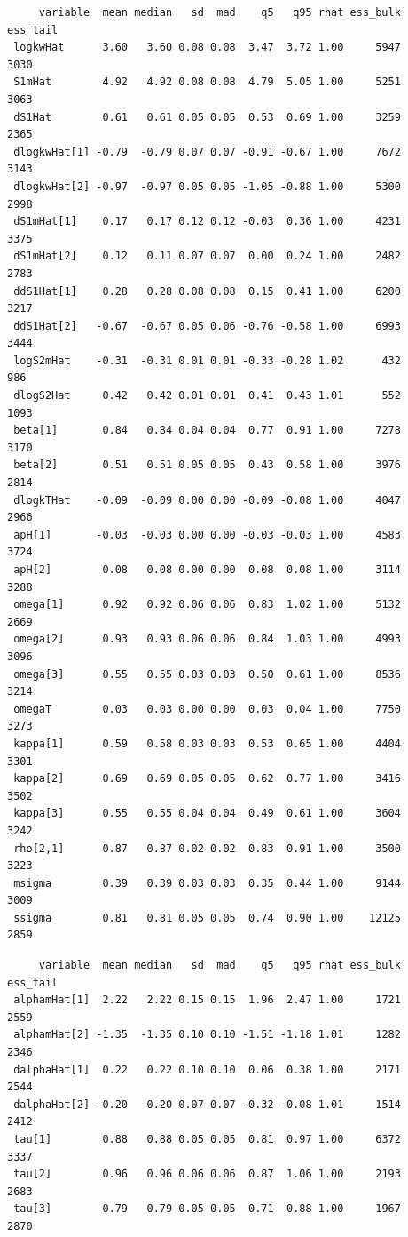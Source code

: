 \documentclass[
]{article}
\begin{document}
\begin{verbatim}
     variable  mean median   sd  mad    q5   q95 rhat ess_bulk ess_tail
 logkwHat      3.60   3.60 0.08 0.08  3.47  3.72 1.00     5947     3030
 S1mHat        4.92   4.92 0.08 0.08  4.79  5.05 1.00     5251     3063
 dS1Hat        0.61   0.61 0.05 0.05  0.53  0.69 1.00     3259     2365
 dlogkwHat[1] -0.79  -0.79 0.07 0.07 -0.91 -0.67 1.00     7672     3143
 dlogkwHat[2] -0.97  -0.97 0.05 0.05 -1.05 -0.88 1.00     5300     2998
 dS1mHat[1]    0.17   0.17 0.12 0.12 -0.03  0.36 1.00     4231     3375
 dS1mHat[2]    0.12   0.11 0.07 0.07  0.00  0.24 1.00     2482     2783
 ddS1Hat[1]    0.28   0.28 0.08 0.08  0.15  0.41 1.00     6200     3217
 ddS1Hat[2]   -0.67  -0.67 0.05 0.06 -0.76 -0.58 1.00     6993     3444
 logS2mHat    -0.31  -0.31 0.01 0.01 -0.33 -0.28 1.02      432      986
 dlogS2Hat     0.42   0.42 0.01 0.01  0.41  0.43 1.01      552     1093
 beta[1]       0.84   0.84 0.04 0.04  0.77  0.91 1.00     7278     3170
 beta[2]       0.51   0.51 0.05 0.05  0.43  0.58 1.00     3976     2814
 dlogkTHat    -0.09  -0.09 0.00 0.00 -0.09 -0.08 1.00     4047     2966
 apH[1]       -0.03  -0.03 0.00 0.00 -0.03 -0.03 1.00     4583     3724
 apH[2]        0.08   0.08 0.00 0.00  0.08  0.08 1.00     3114     3288
 omega[1]      0.92   0.92 0.06 0.06  0.83  1.02 1.00     5132     2669
 omega[2]      0.93   0.93 0.06 0.06  0.84  1.03 1.00     4993     3096
 omega[3]      0.55   0.55 0.03 0.03  0.50  0.61 1.00     8536     3214
 omegaT        0.03   0.03 0.00 0.00  0.03  0.04 1.00     7750     3273
 kappa[1]      0.59   0.58 0.03 0.03  0.53  0.65 1.00     4404     3301
 kappa[2]      0.69   0.69 0.05 0.05  0.62  0.77 1.00     3416     3502
 kappa[3]      0.55   0.55 0.04 0.04  0.49  0.61 1.00     3604     3242
 rho[2,1]      0.87   0.87 0.02 0.02  0.83  0.91 1.00     3500     3223
 msigma        0.39   0.39 0.03 0.03  0.35  0.44 1.00     9144     3009
 ssigma        0.81   0.81 0.05 0.05  0.74  0.90 1.00    12125     2859
\end{verbatim}

\begin{verbatim}
     variable  mean median   sd  mad    q5   q95 rhat ess_bulk ess_tail
 alphamHat[1]  2.22   2.22 0.15 0.15  1.96  2.47 1.00     1721     2559
 alphamHat[2] -1.35  -1.35 0.10 0.10 -1.51 -1.18 1.01     1282     2346
 dalphaHat[1]  0.22   0.22 0.10 0.10  0.06  0.38 1.00     2171     2544
 dalphaHat[2] -0.20  -0.20 0.07 0.07 -0.32 -0.08 1.01     1514     2412
 tau[1]        0.88   0.88 0.05 0.05  0.81  0.97 1.00     6372     3337
 tau[2]        0.96   0.96 0.06 0.06  0.87  1.06 1.00     2193     2683
 tau[3]        0.79   0.79 0.05 0.05  0.71  0.88 1.00     1967     2870
\end{verbatim}
\end{document}
